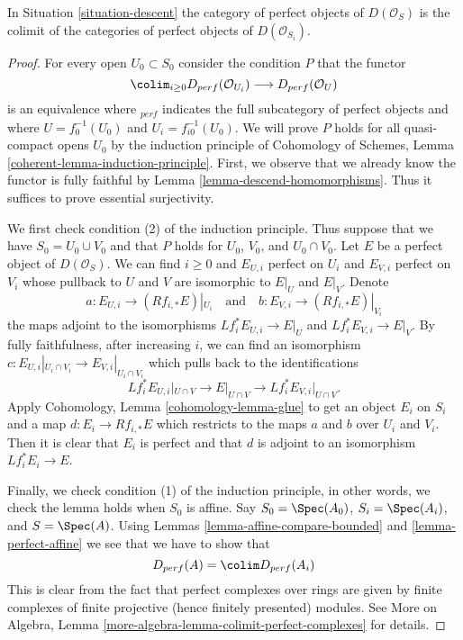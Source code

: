 \begin{lemma}
\label{lemma-descend-perfect}
In Situation \ref{situation-descent} the category of perfect
objects of $D(\mathcal{O}_S)$ is the colimit of the categories
of perfect objects of $D(\mathcal{O}_{S_i})$.
\end{lemma}

\begin{proof}
For every open $U_0 \subset S_0$ consider the condition $P$ that
the functor
$$
\colim_{i \geq 0} D_{perf}(\mathcal{O}_{U_i})
\longrightarrow
D_{perf}(\mathcal{O}_U)
$$
is an equivalence where ${}_{perf}$ indicates the full subcategory of
perfect objects and where $U = f_0^{-1}(U_0)$ and $U_i = f_{i0}^{-1}(U_0)$.
We will prove $P$ holds for all quasi-compact opens $U_0$
by the induction principle of
Cohomology of Schemes, Lemma \ref{coherent-lemma-induction-principle}.
First, we observe that we already know the functor is fully faithful
by Lemma \ref{lemma-descend-homomorphisms}. Thus it suffices to prove
essential surjectivity.

\medskip\noindent
We first check condition (2) of the induction principle. Thus suppose
that we have $S_0 = U_0 \cup V_0$ and that $P$ holds for
$U_0$, $V_0$, and $U_0 \cap V_0$. Let $E$ be a perfect object
of $D(\mathcal{O}_S)$. We can find $i \geq 0$ and $E_{U, i}$ perfect on $U_i$
and $E_{V, i}$ perfect on $V_i$ whose pullback to $U$ and $V$ are isomorphic
to $E|_U$ and $E|_V$. Denote
$$
a : E_{U, i} \to (Rf_{i, *}E)|_{U_i}
\quad\text{and}\quad
b : E_{V, i} \to (Rf_{i, *}E)|_{V_i}
$$
the maps adjoint to the isomorphisms $Lf_i^*E_{U, i} \to E|_U$
and $Lf_i^*E_{V, i} \to E|_V$.
By fully faithfulness, after increasing $i$,
we can find an isomorphism
$c : E_{U, i}|_{U_i \cap V_i} \to E_{V, i}|_{U_i \cap V_i}$
which pulls back to the identifications 
$$
Lf_i^*E_{U, i}|_{U \cap V} \to E|_{U \cap V} \to Lf_i^*E_{V, i}|_{U \cap V}.
$$
Apply Cohomology, Lemma \ref{cohomology-lemma-glue}
to get an object $E_i$ on $S_i$ and a map $d : E_i \to Rf_{i, *}E$
which restricts to the maps $a$ and $b$ over $U_i$ and $V_i$.
Then it is clear that $E_i$ is perfect and that
$d$ is adjoint to an isomorphism $Lf_i^*E_i \to E$.

\medskip\noindent
Finally, we check condition (1) of the induction principle, in other
words, we check the lemma holds when $S_0$ is affine.
Say $S_0 = \Spec(A_0)$, $S_i = \Spec(A_i)$, and
$S = \Spec(A)$. Using Lemmas \ref{lemma-affine-compare-bounded}
and \ref{lemma-perfect-affine} we see that we have to show that
$$
D_{perf}(A) = \colim D_{perf}(A_i)
$$
This is clear from the fact that perfect complexes over rings are
given by finite complexes of finite projective (hence finitely presented)
modules. See More on Algebra, Lemma
\ref{more-algebra-lemma-colimit-perfect-complexes} for details.
\end{proof}





